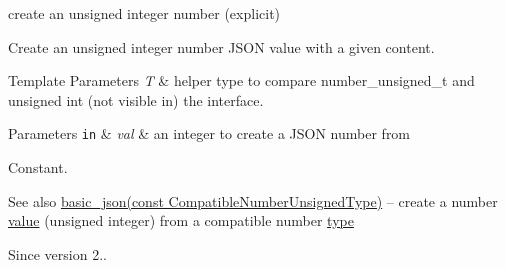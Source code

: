 create an unsigned integer number (explicit) 

Create an unsigned integer number J\+S\+ON value with a given content.


\begin{DoxyTemplParams}{Template Parameters}
{\em T} & helper type to compare number\+\_\+unsigned\+\_\+t and unsigned int (not visible in) the interface.\\
\hline
\end{DoxyTemplParams}

\begin{DoxyParams}[1]{Parameters}
\mbox{\tt in}  & {\em val} & an integer to create a J\+S\+ON number from\\
\hline
\end{DoxyParams}
Constant.

\begin{DoxySeeAlso}{See also}
\hyperlink{a00025_a68a5f34b164a07b8ced13fcf2b7ec834}{basic\+\_\+json(const Compatible\+Number\+Unsigned\+Type)} -- create a number \hyperlink{a00025_a0a2cbbd95862a623e7dc5c37e67dead0}{value} (unsigned integer) from a compatible number \hyperlink{a00025_a848cbae3bd3502ffbf738320bf5eb3aa}{type}
\end{DoxySeeAlso}
\begin{DoxySince}{Since}
version 2.. 
\end{DoxySince}
